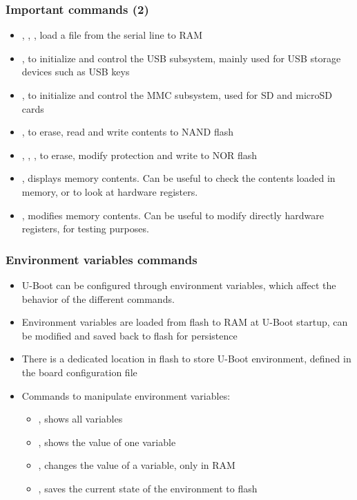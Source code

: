 \begin{frame}
  \frametitle{Important commands (2)}
  \begin{itemize}
  \item {}, , , load a file from the
    serial line to RAM
  \item {}, to initialize and control the USB subsystem,
    mainly used for USB storage devices such as USB keys
  \item {}, to initialize and control the MMC subsystem, used
    for SD and microSD cards
  \item {}, to erase, read and write contents to NAND flash
  \item {}, , , to erase, modify
    protection and write to NOR flash
  \item {}, displays memory contents. Can be useful to check the
    contents loaded in memory, or to look at hardware registers.
  \item {}, modifies memory contents. Can be useful to modify
    directly hardware registers, for testing purposes.
\end{itemize}
\end{frame}

\begin{frame}
  \frametitle{Environment variables commands}
  \begin{itemize}
  \item U-Boot can be configured through environment variables, which
    affect the behavior of the different commands.
  \item Environment variables are loaded from flash to RAM at U-Boot
    startup, can be modified and saved back to flash for persistence
  \item There is a dedicated location in flash to store U-Boot
    environment, defined in the board configuration file
  \item Commands to manipulate environment variables:
    \begin{itemize}
    \item {}, shows all variables
    \item {}, shows the value of one variable
    \item {}, changes the
      value of a variable, only in RAM
    \item {}, saves the current state of the environment to flash
    \end{itemize}
  \end{itemize}
\end{frame}

